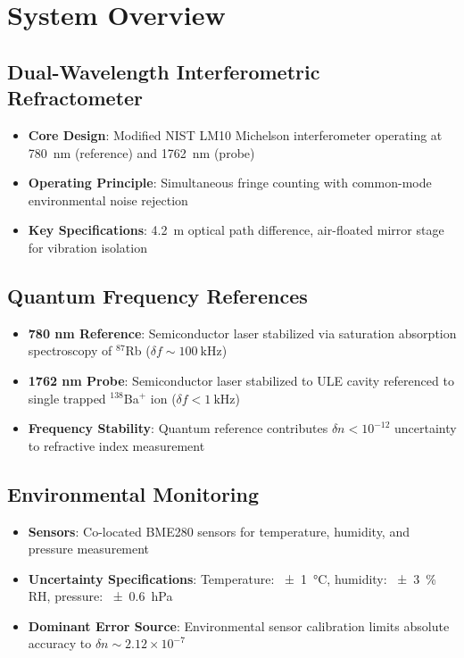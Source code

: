 \documentclass[aip,reprint,groupedaddress,onecolumn,superscriptaddress]{revtex4-2}
\begin{document}
\section{System Overview}

\subsection{Dual-Wavelength Interferometric Refractometer}
\begin{itemize}
    \item \textbf{Core Design}: Modified NIST LM10 Michelson interferometer\cite{fox1999reliable} operating at \SI{780}{\nano\meter} (reference) and \SI{1762}{\nano\meter} (probe)
    \item \textbf{Operating Principle}: Simultaneous fringe counting with common-mode environmental noise rejection
    \item \textbf{Key Specifications}: \SI{4.2}{\meter} optical path difference, air-floated mirror stage for vibration isolation
\end{itemize}

\subsection{Quantum Frequency References}
\begin{itemize}
    \item \textbf{780 nm Reference}: Semiconductor laser stabilized via saturation absorption spectroscopy of $^{87}$Rb ($\delta f \sim \SI{100}{\kilo\hertz}$)
    \item \textbf{1762 nm Probe}: Semiconductor laser stabilized to ULE cavity referenced to single trapped $^{138}$Ba$^+$ ion ($\delta f < \SI{1}{\kilo\hertz}$)
    \item \textbf{Frequency Stability}: Quantum reference contributes $\delta n < 10^{-12}$ uncertainty to refractive index measurement
\end{itemize}

\subsection{Environmental Monitoring}
\begin{itemize}
    \item \textbf{Sensors}: Co-located BME280 sensors for temperature, humidity, and pressure measurement
    \item \textbf{Uncertainty Specifications}: Temperature: \SI{\pm 1}{\degreeCelsius}, humidity: \SI{\pm 3}{\percent} RH, pressure: \SI{\pm 0.6}{\hecto\pascal}
    \item \textbf{Dominant Error Source}: Environmental sensor calibration limits absolute accuracy to $\delta n \sim 2.12\times10^{-7}$
\end{itemize}
\end{document}

